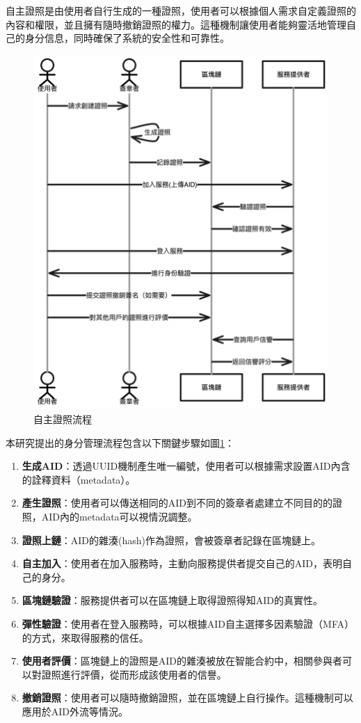 自主證照是由使用者自行生成的一種證照，使用者可以根據個人需求自定義證照的內容和權限，並且擁有隨時撤銷證照的權力。這種機制讓使用者能夠靈活地管理自己的身分信息，同時確保了系統的安全性和可靠性。
\begin{figure}
  \centering
  \includegraphics[width=\linewidth,keepaspectratio]{figures/flow-sc.png}
  \caption{自主證照流程}
  \label{fig:flow-sc}
\end{figure}
本研究提出的身分管理流程包含以下關鍵步驟如圖\ref{fig:flow-sc}：
\begin{enumerate}
  \item \textbf{生成AID}：透過UUID\cite{uuid}機制產生唯一編號，使用者可以根據需求設置AID內含的詮釋資料（metadata）。
  \item \textbf{產生證照}：使用者可以傳送相同的AID到不同的簽章者處建立不同目的的證照，AID內的metadata可以視情況調整。
  \item \textbf{證照上鏈}：AID的雜湊(hash)作為證照，會被簽章者記錄在區塊鏈上。
  \item \textbf{自主加入}：使用者在加入服務時，主動向服務提供者提交自己的AID，表明自己的身分。
  \item \textbf{區塊鏈驗證}：服務提供者可以在區塊鏈上取得證照得知AID的真實性。
  \item \textbf{彈性驗證}：使用者在登入服務時，可以根據AID自主選擇多因素驗證（MFA）的方式，來取得服務的信任。
  \item \textbf{使用者評價}：區塊鏈上的證照是AID的雜湊被放在智能合約中，相關參與者可以對證照進行評價，從而形成該使用者的信譽。
  \item \textbf{撤銷證照}：使用者可以隨時撤銷證照，並在區塊鏈上自行操作。這種機制可以應用於AID外流等情況。
\end{enumerate}
